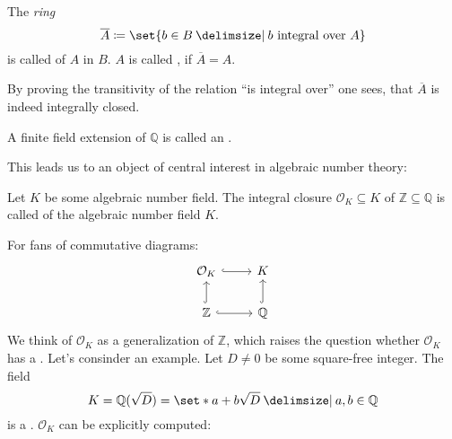 \begin{definition}[{name=[integral closure]}]
	The \emph{ring}
	\[
		\overline{A} \coloneqq \set{b \in B \given b \text{ integral over }A}
	\]
	is called  of $A$ in $B$.
	$A$ is called , if $\overline{A} = A$.
\end{definition}

By proving the transitivity of the relation \enquote{is integral over} one sees, that $\overline{A}$ is indeed integrally closed.

\begin{definition}[{name=[algebraic number field]}]
	A finite field extension of $\mathbb{Q}$ is called an .
\end{definition}

This leads us to an object of central interest in algebraic number theory:

\begin{definition}[{name=[ring of integers]}]
	Let $K$ be some algebraic number field.
	The integral closure $\mathcal{O}_K \subseteq K$ of $\mathbb{Z} \subseteq \mathbb{Q}$ is called  of the algebraic number field $K$.
\end{definition}

For fans of commutative diagrams:
\[
	\begin{tikzcd}
		\mathcal{O}_K \rar[hook] & K \\
		\mathbb{Z} \uar[hook] \rar[hook] & \mathbb{Q} \uar[hook]
	\end{tikzcd}
\]
We think of $\mathcal{O}_K$ as a generalization of $\mathbb{Z}$, which raises the question whether $\mathcal{O}_K$ has a . Let's consinder an example.
Let $D\neq 0$ be some square-free integer.
The field
\[
	K=\mathbb{Q}(\sqrt{D}) = \set*{a + b \sqrt{D} \given a,b \in \mathbb{Q}}
\]
is a . $\mathcal{O}_K$ can be explicitly computed:

